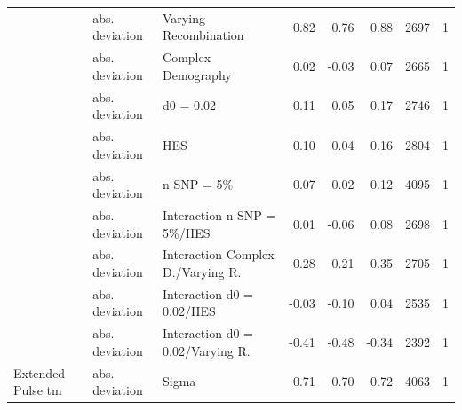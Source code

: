 \documentclass[11pt]{article}
\begin{document}
\begin{table}[H]
\begin{tabular}[t]{l|l|l|r|r|r|r|r}
 & abs. deviation & Varying Recombination & 0.82 & 0.76 & 0.88 & 2697 & 1\\

 & abs. deviation & Complex Demography & 0.02 & -0.03 & 0.07 & 2665 & 1\\

 & abs. deviation & d0 = 0.02 & 0.11 & 0.05 & 0.17 & 2746 & 1\\

 & abs. deviation & HES & 0.10 & 0.04 & 0.16 & 2804 & 1\\

 & abs. deviation & n SNP = 5\% & 0.07 & 0.02 & 0.12 & 4095 & 1\\

 & abs. deviation & Interaction n SNP = 5\%/HES & 0.01 & -0.06 & 0.08 & 2698 & 1\\

 & abs. deviation & Interaction Complex D./Varying R. & 0.28 & 0.21 & 0.35 & 2705 & 1\\

 & abs. deviation & Interaction d0 = 0.02/HES & -0.03 & -0.10 & 0.04 & 2535 & 1\\

 & abs. deviation & Interaction d0 = 0.02/Varying R. & -0.41 & -0.48 & -0.34 & 2392 & 1\\

\multirow{-12}{*}{\raggedright\arraybackslash Extended Pulse tm} & abs. deviation & Sigma & 0.71 & 0.70 & 0.72 & 4063 & 1\\
\hline
\end{tabular}
\end{table}
\end{document}
